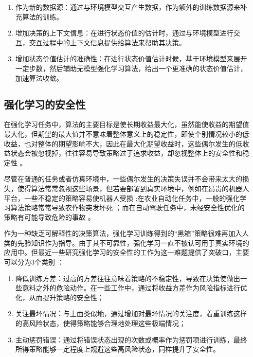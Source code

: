 \begin{enumerate}
    \item 作为新的数据源：通过与环境模型交互产生数据，作为额外的训练数据源来补充算法的训练。
    \item 增加决策的上下文信息：在进行状态价值的估计时，通过与环境模型进行交互，交互过程中的上下文信息提供给算法来帮助其决策。
    \item 增加状态价值估计的准确性：在进行状态价值估计时候，基于环境模型来展开一定步数，然后辅助无模型强化学习算法，给出一个更准确的状态价值估计，加速算法收敛。
\end{enumerate}

\subsection{强化学习的安全性}

在强化学习任务中，算法的主要目标是使长期收益最大化，虽然能使收益的期望值最大化，但期望的最大值并不意味着整体意义上的稳定性，即使个别情况较小的低收益，也对整体的期望影响不大，因此在最大化期望收益时，这些偶尔发生的低收益状态会被忽视掉，往往容易导致策略过于追求收益，却忽视整体上的安全性和稳定性 \cite{garcia2015comprehensive}。

尽管在普通的任务或者仿真环境中，一些偶尔发生的决策失误并不会带来太大的损失，使得算法常常忽视这些场景，但若要部署到真实环境中，例如在昂贵的机器人平台，一些不稳定的策略容易使机器人受损 \cite{kormushev2010robot};在农业自动化任务中，一般的强化学习算法策略常常导致农作物突发坏死 \cite{bu2019smart}；而在自动驾驶任务中，未经安全性优化的策略有可能导致危险的事故 \cite{sallab2017deep}。

作为一种缺乏可解释性的决策算法，强化学习训练得到的“黑箱”策略很难再加入人类的先验知识作为指导。由于其不可靠性，强化学习一直不被认可用于真实环境的应用中。但最近一些研究强化学习的安全性的工作为这一难题提供了突破口，主要可以分为3个类别 \cite{munos2016safe}：

\begin{enumerate}
    \item 降低训练方差：过高的方差往往意味着策略的不稳定性，导致在决策使做出一些意料之外的危险动作。在一些工作中，通过将收益方差作为风险指标进行优化，从而提升策略的安全性；
    \item 关注最坏情况：与上面类似地，通过增加对最坏情况的关注度，着重训练这样的高风险状态，使得策略能够合理地处理这些极端情况；
    \item 主动惩罚错误：通过将错误状态出现的次数或概率作为惩罚项进行训练，最终所得策略能够一定程度上规避这些高风险状态，同样提升了安全性。
\end{enumerate}

